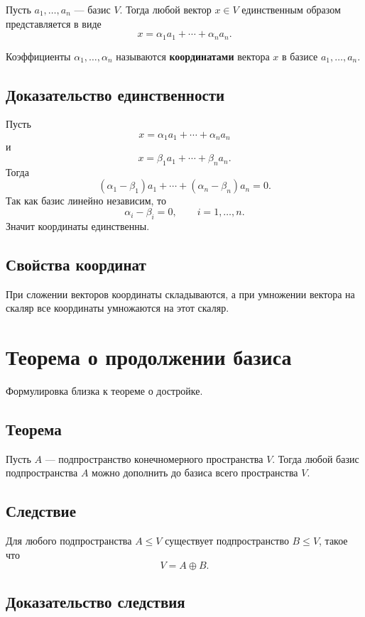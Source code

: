 \documentclass[12pt,a4paper]{article}
\begin{document}
Пусть $a_1,\ldots,a_n$ --- базис $V$. Тогда любой вектор $x\in V$ единственным образом представляется в виде
\[
    x=\alpha_1a_1+\cdots+\alpha_na_n.
\]

Коэффициенты $\alpha_1,\ldots,\alpha_n$ называются \textbf{координатами} вектора $x$ в базисе $a_1,\ldots,a_n$.

\subsection*{Доказательство единственности}

Пусть
\[
    x=\alpha_1a_1+\cdots+\alpha_na_n
\]
и
\[
    x=\beta_1a_1+\cdots+\beta_na_n.
\]
Тогда
\[
    (\alpha_1-\beta_1)a_1+\cdots+(\alpha_n-\beta_n)a_n=0.
\]
Так как базис линейно независим, то
\[
    \alpha_i-\beta_i=0,\qquad i=1,\ldots,n.
\]
Значит координаты единственны.

\subsection*{Свойства координат}

При сложении векторов координаты складываются, а при умножении вектора на скаляр все координаты умножаются на этот скаляр.

\section{Теорема о продолжении базиса}

Формулировка близка к теореме о достройке.

\subsection*{Теорема}

Пусть $A$ --- подпространство конечномерного пространства $V$. Тогда любой базис подпространства $A$ можно дополнить до базиса всего пространства $V$.

\subsection*{Следствие}

Для любого подпространства $A\le V$ существует подпространство $B\le V$, такое что
\[
    V=A\oplus B.
\]

\subsection*{Доказательство следствия}
\end{document}
